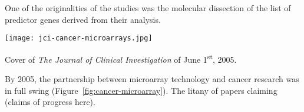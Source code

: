 One of the originalities of the  studies was the molecular
dissection of the list of predictor genes derived from their analysis.

\clearpage

\begin{marginfigure}%
  \texttt{[image: jci-cancer-microarrays.jpg]}
  \caption{Cover of \emph{The Journal of Clinical Investigation} of June
1\textsuperscript{st}, 2005.}
  \label{fig:cancer-microarray}
\end{marginfigure}

By 2005, the partnership between microarray technology and cancer research was
in full swing (Figure~\ref{fig:cancer-microarray}).  The litany of papers
claiming (claims of progress here).










\bigskip

